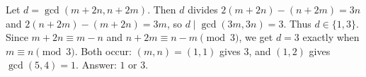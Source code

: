 Let $d=\gcd(m+2n,n+2m)$. Then $d$ divides $2(m+2n)-(n+2m)=3n$ and $2(n+2m)-(m+2n)=3m$, so $d\mid\gcd(3m,3n)=3$. Thus $d\in\{1,3\}$. Since $m+2n\equiv m-n$ and $n+2m\equiv n-m\pmod3$, we get $d=3$ exactly when $m\equiv n\pmod3$. Both occur: $(m,n)=(1,1)$ gives $3$, and $(1,2)$ gives $\gcd(5,4)=1$. Answer: $\boxed{1\text{ or }3}$.
